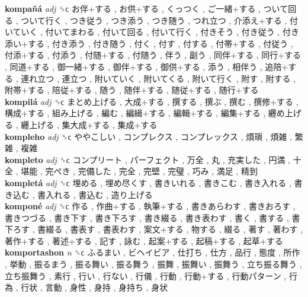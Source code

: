 \textbf{kompañá} \emph{adj}  ␝ϲ   お伴+する ,  お供+する ,  くっつく ,  ご一緒+する ,  ついて回る ,  ついて行く ,  つき従う ,  つき添う ,  つき随う ,  つれ立つ ,  介添え+する ,  付いていく ,  付いてまわる ,  付いて回る ,  付いて行く ,  付きそう ,  付き従う ,  付き添い+する ,  付き添う ,  付き随う ,  付く ,  付す ,  付する ,  付帯+する ,  付従う ,  付添+する ,  付添う ,  付随+する ,  付随う ,  伴う ,  副う ,  同伴+する ,  同行+する ,  同道+する ,  御一緒+する ,  御伴+する ,  御供+する ,  添う ,  相伴う ,  追陪+する ,  連れ立つ ,  連立つ ,  附いていく ,  附いてくる ,  附いて行く ,  附す ,  附する ,  附帯+する ,  陪従+する ,  随う ,  随伴+する ,  随従+する ,  随行+する   \\
\textbf{kompilá} \emph{adj}  ␝ϲ   まとめ上げる ,  大成+する ,  撰する ,  撰ぶ ,  撰む ,  撰修+する ,  構成+する ,  組み上げる ,  編む ,  編緝+する ,  編輯+する ,  編集+する ,  纒め上げる ,  纒上げる ,  集大成+する ,  集成+する   \\
\textbf{kompleho} \emph{adj}  ␝ϲ   ややこしい ,  コンプレクス ,  コンプレックス ,  煩瑣 ,  煩雑 ,  繁雑 ,  複雑   \\
\textbf{kompleto} \emph{adj}  ␝ϲ   コンプリート ,  パーフェクト ,  万全 ,  丸 ,  充実した ,  円満 ,  十全 ,  堪能 ,  完ぺき ,  完備した ,  完全 ,  完壁 ,  完璧 ,  巧み ,  満足 ,  精到   \\
\textbf{kompletá} \emph{adj}  ␝ϲ   埋める ,  埋め尽くす ,  書きいれる ,  書きこむ ,  書き入れる ,  書き込む ,  書入れる ,  書込む ,  造り上げる   \\
\textbf{komponé} \emph{adj}  ␝ϲ   作る ,  作曲+する ,  執筆+する ,  書きあらわす ,  書きおろす ,  書きつづる ,  書き下す ,  書き下ろす ,  書き綴る ,  書き表わす ,  書く ,  書する ,  書下ろす ,  書綴る ,  書表す ,  書表わす ,  案文+する ,  物する ,  綴る ,  著す ,  著わす ,  著作+する ,  著述+する ,  記す ,  詠む ,  起案+する ,  起稿+する ,  起草+する   \\
\textbf{komportashon} \emph{n}  ␝ϲ   ふるまい ,  ビヘイビア ,  仕打ち ,  仕方 ,  品行 ,  態度 ,  所作 ,  挙動 ,  振るまう ,  振る舞い ,  振る舞う ,  振舞 ,  振舞い ,  振舞う ,  立ち振る舞う ,  立ち振舞う ,  素行 ,  行い ,  行ない ,  行儀 ,  行動 ,  行動+する ,  行動パターン ,  行為 ,  行状 ,  言動 ,  身性 ,  身持 ,  身持ち ,  身状   \\
